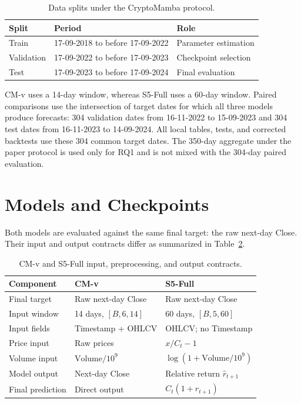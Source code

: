 \documentclass[13pt,a4paper,oneside]{report}
\begin{document}
\begin{table}[htbp]
\centering
\caption{Data splits under the CryptoMamba protocol.}
\label{tab:splits}
\begin{tabularx}{\linewidth}{@{}lXX@{}}
\toprule
\textbf{Split} & \textbf{Period} & \textbf{Role} \\
\midrule
Train & 17-09-2018 to before 17-09-2022 & Parameter estimation \\
Validation & 17-09-2022 to before 17-09-2023 & Checkpoint selection \\
Test & 17-09-2023 to before 17-09-2024 & Final evaluation \\
\bottomrule
\end{tabularx}
\end{table}

CM-v uses a 14-day window, whereas S5-Full uses a 60-day window. Paired comparisons use the
intersection of target dates for which all three models produce forecasts: 304 validation dates
from 16-11-2022 to 15-09-2023 and 304 test dates from 16-11-2023 to 14-09-2024. All local tables,
tests, and corrected backtests use these 304 common target dates. The 350-day aggregate under the
paper protocol is used only for RQ1 and is not mixed with the 304-day paired evaluation.

\section{Models and Checkpoints}\label{sec:model-contracts}
Both models are evaluated against the same final target: the raw next-day Close. Their input and
output contracts differ as summarized in Table~\ref{tab:model-contracts}.

\begin{table}[H]
\centering
\caption{CM-v and S5-Full input, preprocessing, and output contracts.}
\label{tab:model-contracts}
{\small
\begin{tabularx}{\linewidth}{@{}lXX@{}}
\toprule
\textbf{Component} & \textbf{CM-v} & \textbf{S5-Full} \\
\midrule
Final target & Raw next-day Close & Raw next-day Close \\
Input window & 14 days, $[B,6,14]$ & 60 days, $[B,5,60]$ \\
Input fields & Timestamp + OHLCV & OHLCV; no Timestamp \\
Price input & Raw prices & $x/C_t-1$ \\
Volume input & $\mathrm{Volume}/10^9$ & $\log(1+\mathrm{Volume}/10^9)$ \\
Model output & Next-day Close & Relative return $\widehat r_{t+1}$ \\
Final prediction & Direct output & $C_t(1+\widehat r_{t+1})$ \\
\bottomrule
\end{tabularx}}
\end{table}
\end{document}
